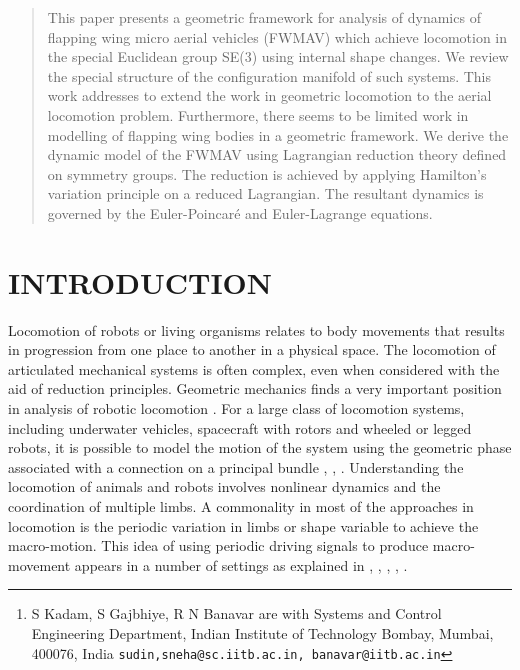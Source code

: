 \documentclass[letterpaper, 10 pt, conference]{ieeeconf}  \newcommand{\RN}[1]{\textup{\uppercase\expandafter{\romannumeral#1}}}
\author{S. Kadam, S. Gajbhiye and R. N. Banavar\thanks{
S Kadam, S Gajbhiye, R N Banavar are with Systems and Control Engineering Department, Indian Institute of Technology Bombay,
        Mumbai, 400076, India
        {\tt\small sudin,sneha@sc.iitb.ac.in, banavar@iitb.ac.in}}}
\begin{document}
\maketitle
\thispagestyle{empty}
\pagestyle{empty}
\begin{abstract}
This paper presents a geometric framework for analysis of dynamics of flapping wing micro aerial vehicles (FWMAV) which achieve locomotion in the special Euclidean group SE(3) using internal shape changes. We review the special structure of the configuration manifold of such systems. This work addresses to extend the work in geometric locomotion to the aerial locomotion problem. Furthermore, there seems to be limited work in modelling of flapping wing bodies in a geometric framework. We derive the dynamic model of the FWMAV using Lagrangian reduction theory defined on symmetry groups. The reduction is achieved by applying Hamilton's variation principle on a reduced Lagrangian. The resultant dynamics is governed by the Euler-Poincar\'{e} and Euler-Lagrange equations.

\end{abstract}

\section{INTRODUCTION}

Locomotion of robots or living organisms relates to body movements that results in progression from one place to another in a physical space. The locomotion of articulated mechanical systems is often complex, even when considered with the aid of reduction principles. Geometric mechanics finds a very important position in analysis of robotic locomotion \cite{Bloch book}. For a large class of locomotion systems, including underwater vehicles, spacecraft with rotors and wheeled or legged robots, it is possible to model the motion of the system using the geometric phase associated with a connection on a principal bundle  \cite{liang}, \cite{cabrera}, \cite{marsden_krishna_bloch}. Understanding the locomotion of animals and robots involves nonlinear dynamics and the coordination of multiple limbs. A commonality in most of the approaches in locomotion is the periodic variation in limbs or shape variable to achieve the macro-motion. This idea of using periodic driving signals to produce macro-movement appears in a number of settings as explained in \cite{liang}, \cite{cabrera}, \cite{Fairchild beanie}, \cite{Chung dorothy}, \cite{Kuang robobat}.
\end{document}
